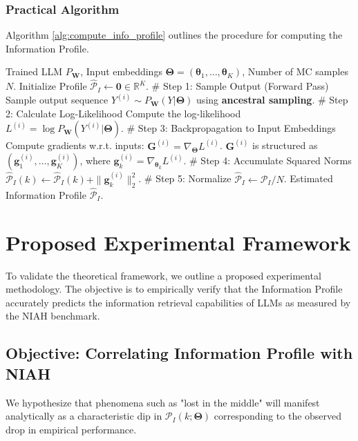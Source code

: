 \documentclass{article}
\theoremstyle{definition}
\begin{document}
\subsubsection{Practical Algorithm}
Algorithm \ref{alg:compute_info_profile} outlines the procedure for computing the Information Profile.

\begin{algorithm}
\caption{Computation of the Information Profile via Monte Carlo Estimation}\label{alg:compute_info_profile}
\begin{algorithmic}[1]
\Require Trained LLM $P_{\mathbf{W}}$, Input embeddings $\mathbf{\Theta} = (\boldsymbol{\theta}_1, \dots, \boldsymbol{\theta}_K)$, Number of MC samples $N$.
\State Initialize Profile $\hat{\mathcal{P}}_I \leftarrow \mathbf{0} \in \mathbb{R}^K$.
    \State \# Step 1: Sample Output (Forward Pass)
    \State Sample output sequence $Y^{(i)} \sim P_{\mathbf{W}}(Y|\mathbf{\Theta})$ using \textbf{ancestral sampling}.
    \State
    \State \# Step 2: Calculate Log-Likelihood
    \State Compute the log-likelihood $L^{(i)} = \log P_{\mathbf{W}}(Y^{(i)}|\mathbf{\Theta})$.
    \State
    \State \# Step 3: Backpropagation to Input Embeddings
    \State Compute gradients w.r.t. inputs: $\mathbf{G}^{(i)} = \nabla_{\mathbf{\Theta}} L^{(i)}$.
    \State $\mathbf{G}^{(i)}$ is structured as $(\mathbf{g}_1^{(i)}, \dots, \mathbf{g}_K^{(i)})$, where $\mathbf{g}_k^{(i)} = \nabla_{\boldsymbol{\theta}_k} L^{(i)}$.
    \State
    \State \# Step 4: Accumulate Squared Norms
        \State $\hat{\mathcal{P}}_I(k) \leftarrow \hat{\mathcal{P}}_I(k) + \|\mathbf{g}_k^{(i)}\|_2^2$.
    \EndFor
\EndFor
\State \# Step 5: Normalize
\State $\hat{\mathcal{P}}_I \leftarrow \hat{\mathcal{P}}_I / N$.
\Ensure Estimated Information Profile $\hat{\mathcal{P}}_I$.
\end{algorithmic}
\end{algorithm}

\section{Proposed Experimental Framework}
To validate the theoretical framework, we outline a proposed experimental methodology. The objective is to empirically verify that the Information Profile accurately predicts the information retrieval capabilities of LLMs as measured by the NIAH benchmark.

\subsection{Objective: Correlating Information Profile with NIAH}
We hypothesize that phenomena such as "lost in the middle" will manifest analytically as a characteristic dip in $\mathcal{P}_I(k; \mathbf{\Theta})$ corresponding to the observed drop in empirical performance.
\end{document}
